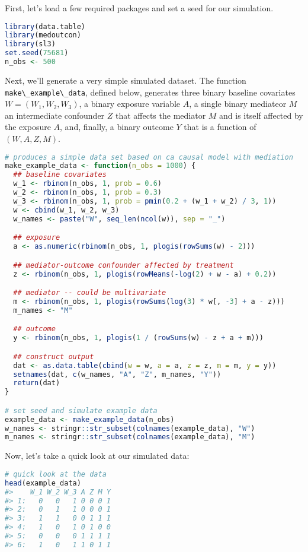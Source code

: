 \documentclass[
  12pt,
]{book}
\newcommand{\passthrough}[1]{#1}
\theoremstyle{definition}
\theoremstyle{definition}
\theoremstyle{definition}
\newcommand{\1}{\mathbbm{1}}
\begin{document}
First, let's load a few required packages and set a seed for our simulation.

\begin{lstlisting}[language=R]
library(data.table)
library(medoutcon)
library(sl3)
set.seed(75681)
n_obs <- 500
\end{lstlisting}

Next, we'll generate a very simple simulated dataset. The function
\passthrough{\lstinline!make\_example\_data!}, defined below, generates three binary baseline covariates
\(W = (W_1, W_2, W_3)\), a binary exposure variable \(A\), a single binary mediateor
\(M\) an intermediate confounder \(Z\) that affects the mediator \(M\) and is itself
affected by the exposure \(A\), and, finally, a binary outcome \(Y\) that is a
function of \((W, A, Z, M)\).

\begin{lstlisting}[language=R]
# produces a simple data set based on ca causal model with mediation
make_example_data <- function(n_obs = 1000) {
  ## baseline covariates
  w_1 <- rbinom(n_obs, 1, prob = 0.6)
  w_2 <- rbinom(n_obs, 1, prob = 0.3)
  w_3 <- rbinom(n_obs, 1, prob = pmin(0.2 + (w_1 + w_2) / 3, 1))
  w <- cbind(w_1, w_2, w_3)
  w_names <- paste("W", seq_len(ncol(w)), sep = "_")

  ## exposure
  a <- as.numeric(rbinom(n_obs, 1, plogis(rowSums(w) - 2)))

  ## mediator-outcome confounder affected by treatment
  z <- rbinom(n_obs, 1, plogis(rowMeans(-log(2) + w - a) + 0.2))

  ## mediator -- could be multivariate
  m <- rbinom(n_obs, 1, plogis(rowSums(log(3) * w[, -3] + a - z)))
  m_names <- "M"

  ## outcome
  y <- rbinom(n_obs, 1, plogis(1 / (rowSums(w) - z + a + m)))

  ## construct output
  dat <- as.data.table(cbind(w = w, a = a, z = z, m = m, y = y))
  setnames(dat, c(w_names, "A", "Z", m_names, "Y"))
  return(dat)
}

# set seed and simulate example data
example_data <- make_example_data(n_obs)
w_names <- stringr::str_subset(colnames(example_data), "W")
m_names <- stringr::str_subset(colnames(example_data), "M")
\end{lstlisting}

Now, let's take a quick look at our simulated data:

\begin{lstlisting}[language=R]
# quick look at the data
head(example_data)
#>    W_1 W_2 W_3 A Z M Y
#> 1:   0   0   1 0 0 0 1
#> 2:   0   1   1 0 0 0 1
#> 3:   1   1   0 0 1 1 1
#> 4:   1   0   1 0 1 0 0
#> 5:   0   0   0 1 1 1 1
#> 6:   1   0   1 1 0 1 1
\end{lstlisting}
\end{document}
